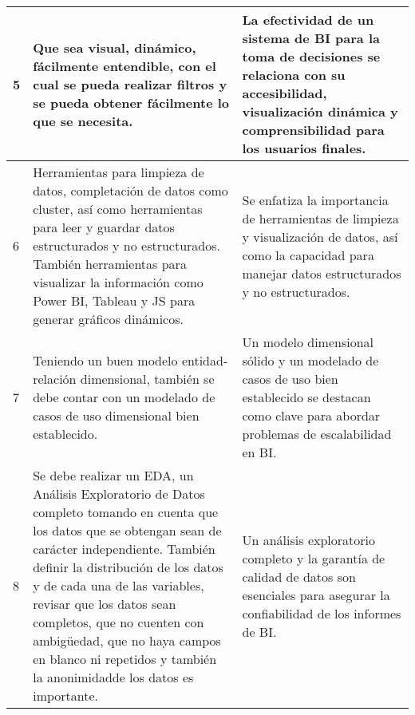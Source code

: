\begin{longtable}{|l|p{5cm}|p{5cm}|}
    5                                                 & Que sea visual, dinámico, fácilmente entendible, con el cual se pueda realizar filtros y se pueda obtener fácilmente lo que se necesita.                                                                                                                                                                                                                                                           & La efectividad de un sistema de BI para la toma de decisiones se relaciona con su accesibilidad, visualización dinámica y comprensibilidad para los usuarios finales.                                                 \\\hline
    6                                                 & Herramientas para limpieza de datos, completación de datos como cluster, así como herramientas para leer y guardar datos estructurados y no estructurados. También herramientas para visualizar la información como Power BI, Tableau y JS para generar gráficos dinámicos.                                                                                                                        & Se enfatiza la importancia de herramientas de limpieza y visualización de datos, así como la capacidad para manejar datos estructurados y no estructurados.                                                           \\\hline
    7                                                 & Teniendo un buen modelo entidad-relación dimensional, también se debe contar con un modelado de casos de uso dimensional bien establecido.                                                                                                                                                                                                                                                         & Un modelo dimensional sólido y un modelado de casos de uso bien establecido se destacan como clave para abordar problemas de escalabilidad en BI.                                                                     \\\hline
    8                                                 & Se debe realizar un EDA, un Análisis Exploratorio de Datos completo tomando en cuenta que los datos que se obtengan sean de carácter independiente. También definir la distribución de los datos y de cada una de las variables, revisar que los datos sean completos, que no cuenten con ambigüedad, que no haya campos en blanco ni repetidos y también la anonimidadde los datos es importante. & Un análisis exploratorio completo y la garantía de calidad de datos son esenciales para asegurar la confiabilidad de los informes de BI.                                                                              \\\hline

\end{longtable}
